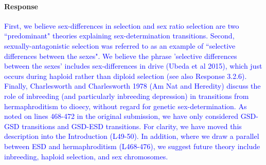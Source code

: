 \documentclass[10pt,letterpaper]{article}
\begin{document}
\noindent\paragraph{Response}
\textcolor{blue}{
First, we believe sex-differences in selection and sex ratio selection are two ``predominant" theories explaining sex-determination transitions. 
Second, sexually-antagonistic selection was referred to as an example of ``selective differences between the sexes". 
We believe the phrase 'selective differences between the sexes' includes sex-differences in drive (Ubeda et al 2015), which just occurs during haploid rather than diploid selection (see also Response 3.2.6).
Finally, Charlesworth and Charlesworth 1978 (Am Nat and Heredity) discuss the role of inbreeding (and particularly inbreeding depression) in transitions from hermaphroditism to dioecy, without regard for genetic sex-determination. 
As noted on lines 468-472 in the original submission, we have only considered GSD-GSD transitions and GSD-ESD transitions.
For clarity, we have moved this description into the Introduction (L49-50). 
In addition, where we draw a parallel between ESD and hermaphroditism (L468-476), we suggest future theory include inbreeding, haploid selection, and sex chromosomes. 
}

\end{document}
